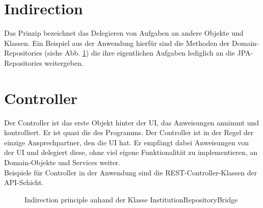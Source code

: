 \section{Indirection}
Das Prinzip  bezeichnet das Delegieren von Aufgaben an andere Objekte und Klassen. Ein Beispiel aus der Anwendung hierfür sind die Methoden der Domain-Repositories (siehe Abb. \ref{fig:indirection}) die ihre eigentlichen Aufgaben lediglich an die JPA-Repositories weitergeben.

\section{Controller}
Der Controller ist das erste Objekt hinter der UI, das Anweisungen annimmt und kontrolliert. Er ist quasi die  des Programms. Der Controller ist in der Regel der einzige Ansprechpartner, den die UI hat. Er empfängt dabei Anweisungen von der UI und delegiert diese, ohne viel eigene Funktionalität zu implementieren, an Domain-Objekte und Services weiter.\\
Beispiele für Controller in der Anwendung sind die REST-Controller-Klassen der API-Schicht.

\begin{figure}[!htb]
    \caption[Indirection Principle]{Indirection principle anhand der Klasse InstitutionRepositoryBridge}
    \label{fig:indirection}
\end{figure}